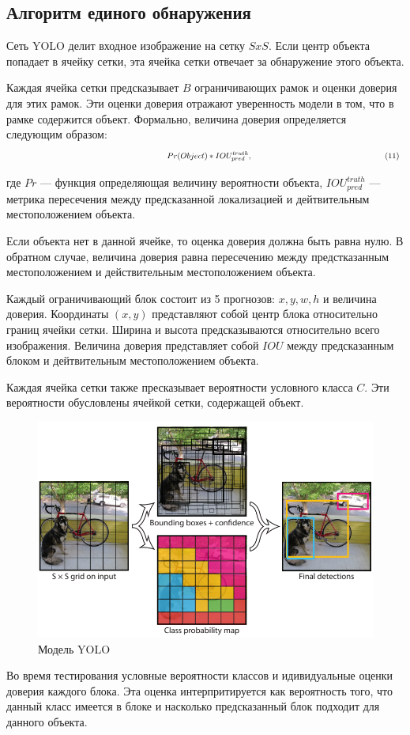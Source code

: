 \documentclass[a4paper,english,russian]{G2-105}
\begin{document}
\subsection{Алгоритм единого обнаружения}
\par Сеть YOLO делит входное изображение на сетку $SxS$. Если центр объекта попадает в ячейку сетки, эта ячейка сетки отвечает за обнаружение этого объекта.
\par Каждая ячейка сетки предсказывает $B$ ограничивающих рамок и оценки доверия для этих рамок. Эти оценки доверия отражают уверенность модели в том, что в рамке содержится объект. Формально, величина доверия определяется следующим образом:
\[
\ \hspace*{66mm} Pr(Object)*IOU_{pred}^{truth},  \ \hspace*{56mm} (11)
\]
\par где $Pr$ --- функция определяющая величину вероятности объекта, $IOU_{pred}^{truth}$ --- метрика пересечения между предсказанной локализацией и дейтвительным местоположением объекта.
\par Если объекта нет в данной ячейке, то оценка доверия должна быть равна нулю. В обратном случае, величина доверия равна пересечению между предстказанным местоположением и действительным местоположением объекта.
\par Каждый ограничивающий блок состоит из 5 прогнозов: $x, y, w, h$ и величина доверия. Координаты $(x, y)$ представляют собой центр блока относительно границ ячейки сетки. Ширина и высота предсказываются относительно всего изображения. Величина доверия представляет собой $IOU$ между предсказанным блоком и дейтвительным местоположением объекта.
\par Каждая ячейка сетки также пресказывает вероятности условного класса $C$. Эти вероятности обусловлены ячейкой сетки, содержащей объект.
\begin{figure}
    \includegraphics[width=0.7\linewidth]{yoloiter.png}
    \caption{Модель YOLO}
	\label{yoloiter}
\end{figure} 
\par Во время тестирования условные вероятности классов и идивидуальные оценки доверия каждого блока. Эта оценка интерпритируется как вероятность того, что данный класс имеется в блоке и насколько предсказанный блок подходит для данного объекта. 
\end{document}
